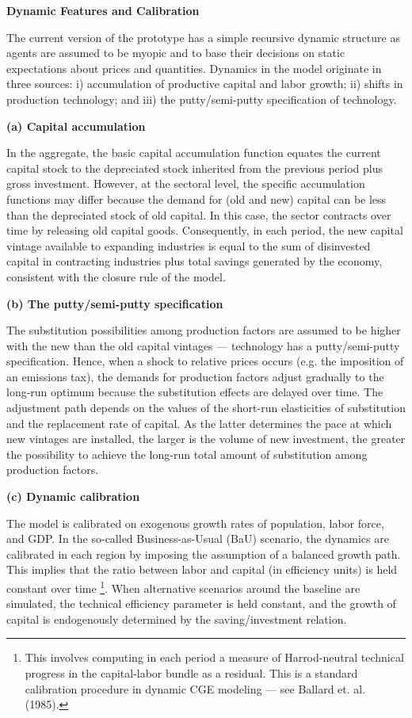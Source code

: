 \documentclass{article}
\begin{document}
\textbf{Dynamic Features and Calibration}

The current version of the prototype has a simple recursive dynamic structure as agents are assumed to be myopic and to base their decisions on static expectations about prices and quantities. Dynamics in the model originate in three sources: i) accumulation of productive capital and labor growth; ii) shifts in production technology; and iii) the putty/semi-putty specification of technology.

\hspace{20pt}\textbf{(a) Capital accumulation}
 
In the aggregate, the basic capital accumulation function equates the current capital stock to the depreciated stock inherited from the previous period plus gross investment. However, at the sectoral level, the specific accumulation functions may differ because the demand for (old and new) capital can be less than the depreciated stock of old capital. In this case, the sector contracts over time by releasing old capital goods. Consequently, in each period, the new capital vintage available to expanding industries is equal to the sum of disinvested capital in contracting industries plus total savings generated by the economy, consistent with the closure rule of the model.

\hspace{20pt}\textbf{(b) The putty/semi-putty specification}

The substitution possibilities among production factors are assumed to be higher with the new than the old capital vintages — technology has a putty/semi-putty specification. Hence, when a shock to relative prices occurs (e.g. the imposition of an emissions tax), the demands for production factors adjust gradually to the long-run optimum because the substitution effects are delayed over time. The adjustment path depends on the values of the short-run elasticities of substitution and the replacement rate of capital. As the latter determines the pace at which new vintages are installed, the larger is the volume of new investment, the greater the possibility to achieve the long-run total amount of substitution among production factors.

\hspace{20pt}\textbf{(c) Dynamic calibration}

The model is calibrated on exogenous growth rates of population, labor force, and GDP. In the so-called Business-as-Usual (BaU) scenario, the dynamics are calibrated in each region by imposing the assumption of a balanced growth path. This implies that the ratio between labor and capital (in efficiency units) is held constant over time \footnote{This involves computing in each period a measure of Harrod-neutral technical progress in the capital-labor bundle as a residual. This is a standard calibration procedure in dynamic CGE modeling — see Ballard et. al. (1985).}. When alternative scenarios around the baseline are simulated, the technical efficiency parameter is held constant, and the growth of capital is endogenously determined by the saving/investment relation.
\end{document}
